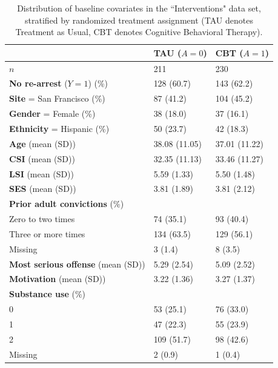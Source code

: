 \documentclass[a4paper,12pt]{article}
\begin{document}
\begin{table}
\begin{tabular}{l|l|l}
\hline
  & TAU ($A=0$) & CBT ($A=1$) \\
\hline
$n$ & 211 & 230    \\
\hline
\textbf{No re-arrest} ($Y=1$) (\%) & 128 (60.7) & 143 (62.2) \\
\hline
\textbf{Site} = San Francisco (\%) & 87 (41.2) & 104 (45.2) \\
\hline
\textbf{Gender} = Female (\%) & 38 (18.0) & 37 (16.1) \\
\hline
\textbf{Ethnicity} = Hispanic (\%) & 50 (23.7) & 42 (18.3) \\
\hline
\textbf{Age} (mean (SD)) & 38.08 (11.05) & 37.01 (11.22) \\
\hline
\textbf{CSI} (mean (SD)) & 32.35 (11.13) & 33.46 (11.27)  \\
\hline
\textbf{LSI} (mean (SD)) & 5.59 (1.33) & 5.50 (1.48)  \\
\hline
\textbf{SES} (mean (SD)) & 3.81 (1.89) & 3.81 (2.12)  \\
\hline
\textbf{Prior adult convictions} (\%) &  &   \\
\hline
\hspace{3mm} Zero to two times & 74 (35.1) & 93 (40.4) \\
\hline
\hspace{3mm} Three or more times & 134 (63.5) & 129 (56.1)  \\
\hline
\hspace{3mm} Missing & 3 (1.4) & 8 (3.5)   \\
\hline
\textbf{Most serious offense} (mean (SD)) & 5.29 (2.54) & 5.09 (2.52)  \\
\hline
\textbf{Motivation} (mean (SD)) & 3.22 (1.36) & 3.27 (1.37)  \\
\hline
\textbf{Substance use} (\%) &  &   \\
\hline
\hspace{3mm} 0 & 53 (25.1) & 76 (33.0) \\
\hline
\hspace{3mm} 1 & 47 (22.3) & 55 (23.9) \\
\hline
\hspace{3mm} 2 & 109 (51.7) & 98 (42.6) \\
\hline
\hspace{3mm} Missing & 2 (0.9) & 1 (0.4)   \\
\hline
\end{tabular}
\caption{Distribution of baseline covariates in the ``Interventions" data set, stratified by randomized treatment assignment (TAU denotes Treatment as Usual, CBT denotes Cognitive Behavioral Therapy). }
\label{table1}
\end{table}
\end{document}
